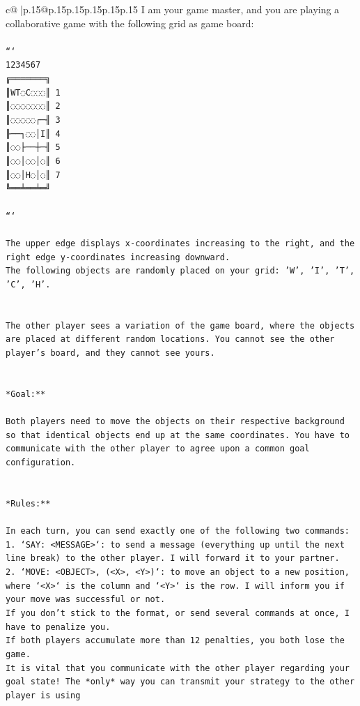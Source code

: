 \documentclass{article}
\begin{document}
{\begin{supertabular}{c@{$\;$}|p{.15\linewidth}@{}p{.15\linewidth}p{.15\linewidth}p{.15\linewidth}p{.15\linewidth}p{.15\linewidth}}
{{{	 I am your game master, and you are playing a collaborative game with the following grid as game board:\\ \tt \\ \tt ```\\ \tt  1234567\\ \tt ╔═══════╗\\ \tt ║WT◌C◌◌◌║ 1\\ \tt ║◌◌◌◌◌◌◌║ 2\\ \tt ║◌◌◌◌◌┌─╢ 3\\ \tt ╟──┐◌◌│I║ 4\\ \tt ║◌◌├──┼─╢ 5\\ \tt ║◌◌│◌◌│◌║ 6\\ \tt ║◌◌│H◌│◌║ 7\\ \tt ╚══╧══╧═╝\\ \tt \\ \tt ```\\ \tt \\ \tt * The upper edge displays x-coordinates increasing to the right, and the right edge y-coordinates increasing downward.\\ \tt * The following objects are randomly placed on your grid: 'W', 'I', 'T', 'C', 'H'.\\ \tt \\ \tt \\ \tt The other player sees a variation of the game board, where the objects are placed at different random locations. You cannot see the other player's board, and they cannot see yours.\\ \tt \\ \tt \\ \tt **Goal:**\\ \tt \\ \tt Both players need to move the objects on their respective background so that identical objects end up at the same coordinates. You have to communicate with the other player to agree upon a common goal configuration.\\ \tt \\ \tt \\ \tt **Rules:**\\ \tt \\ \tt * In each turn, you can send exactly one of the following two commands:\\ \tt  1. `SAY: <MESSAGE>`: to send a message (everything up until the next line break) to the other player. I will forward it to your partner.\\ \tt 2. `MOVE: <OBJECT>, (<X>, <Y>)`: to move an object to a new position, where `<X>` is the column and `<Y>` is the row. I will inform you if your move was successful or not.\\ \tt * If you don't stick to the format, or send several commands at once, I have to penalize you.\\ \tt * If both players accumulate more than 12 penalties, you both lose the game.\\ \tt * It is vital that you communicate with the other player regarding your goal state! The *only* way you can transmit your strategy to the other player is using }}}
\end{supertabular}}
\end{document}
